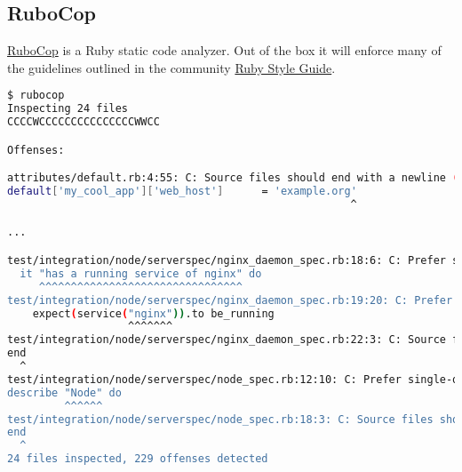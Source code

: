 \subsection{RuboCop}

\href{https://github.com/bbatsov/rubocop}{RuboCop} is a Ruby static code analyzer. Out of the box it will enforce many of the guidelines outlined in the community \href{https://github.com/bbatsov/ruby-style-guide}{Ruby Style Guide}.

\begin{lstlisting}[language=Bash,label=lst:testing-robocop1]
$ rubocop
Inspecting 24 files
CCCCWCCCCCCCCCCCCCCCWWCC

Offenses:

attributes/default.rb:4:55: C: Source files should end with a newline (\n).
default['my_cool_app']['web_host']      = 'example.org'
                                                      ^

...

test/integration/node/serverspec/nginx_daemon_spec.rb:18:6: C: Prefer single-quoted strings when you don't need string interpolation or special symbols.
  it "has a running service of nginx" do
     ^^^^^^^^^^^^^^^^^^^^^^^^^^^^^^^^
test/integration/node/serverspec/nginx_daemon_spec.rb:19:20: C: Prefer single-quoted strings when you don't need string interpolation or special symbols.
    expect(service("nginx")).to be_running
                   ^^^^^^^
test/integration/node/serverspec/nginx_daemon_spec.rb:22:3: C: Source files should end with a newline (\n).
end
  ^
test/integration/node/serverspec/node_spec.rb:12:10: C: Prefer single-quoted strings when you don't need string interpolation or special symbols.
describe "Node" do
         ^^^^^^
test/integration/node/serverspec/node_spec.rb:18:3: C: Source files should end with a newline (\n).
end
  ^
24 files inspected, 229 offenses detected
\end{lstlisting}

